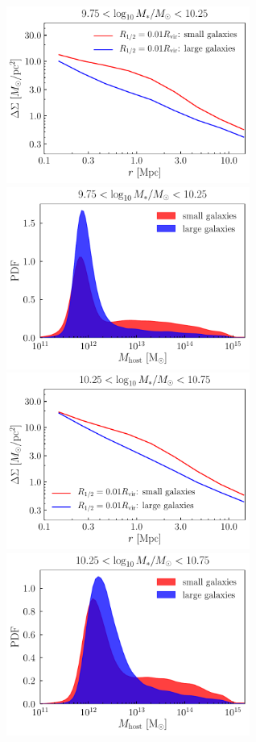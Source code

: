 \documentclass[usenatbib,usegraphicx,letterpaper]{mn2e}
\begin{document}
\begin{figure}
\centering
\includegraphics[width=8cm]{FIGS/rvir_only_lensing_prediction.pdf}
\includegraphics[width=8cm]{FIGS/host_mass_distributions_sm9p75_sm10p25.pdf}
\includegraphics[width=8cm]{FIGS/rvir_only_lensing_prediction2.pdf}
\includegraphics[width=8cm]{FIGS/host_mass_distributions_sm10p25_sm10p75.pdf}

\end{figure}
\end{document}
